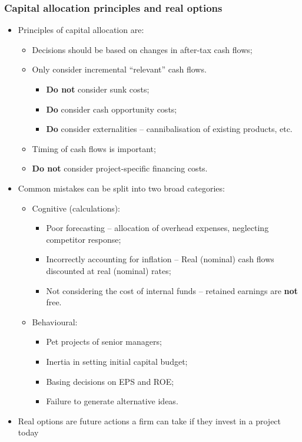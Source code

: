 \documentclass[../notes_compiled.tex]{subfiles}
\begin{document}
\subsubsection{Capital allocation principles and real options}
\begin{itemize}
\item Principles of capital allocation are:
\begin{itemize}
\item Decisions should be based on changes in after-tax cash flows;
\item Only consider incremental ``relevant'' cash flows.
\begin{itemize}
\item \textbf{Do not} consider sunk costs;
\item \textbf{Do} consider cash opportunity costs;
\item \textbf{Do} consider externalities -- cannibalisation of existing products, etc.
\end{itemize}
\item Timing of cash flows is important;
\item \textbf{Do not} consider project-specific financing costs.
\end{itemize}
\item Common mistakes can be split into two broad categories:
\begin{itemize}
\item Cognitive (calculations):
\begin{itemize}
\item Poor forecasting -- allocation of overhead expenses, neglecting competitor response;
\item Incorrectly accounting for inflation -- Real (nominal) cash flows discounted at real (nominal) rates;
\item Not considering the cost of internal funds -- retained earnings are \textbf{not} free.
\end{itemize}
\item Behavioural:
\begin{itemize}
\item Pet projects of senior managers;
\item Inertia in setting initial capital budget;
\item Basing decisions on EPS and ROE;
\item Failure to generate alternative ideas.
\end{itemize}
\end{itemize}
\item Real options are future actions a firm can take if they invest in a project today

\end{itemize}
\end{document}
